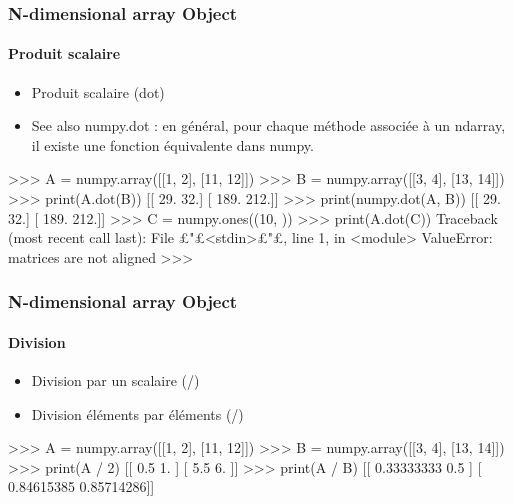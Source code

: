 \begin{frame}[fragile]
\frametitle{N-dimensional array Object}
\framesubtitle{Produit scalaire}
\begin{itemize}
 \item Produit scalaire (dot)
 \item See also numpy.dot : en général, pour chaque méthode associée à un ndarray, il existe une fonction équivalente dans numpy. 
\end{itemize}
\begin{pythonConsole}
>>> A = numpy.array([[1, 2], [11, 12]])
>>> B = numpy.array([[3, 4], [13, 14]])
>>> print(A.dot(B))
[[  29.   32.]
 [ 189.  212.]]
>>> print(numpy.dot(A, B))
[[  29.   32.]
 [ 189.  212.]]
>>> C = numpy.ones((10, ))
>>> print(A.dot(C))
Traceback (most recent call last):
  File £"£<stdin>£"£, line 1, in <module>
ValueError: matrices are not aligned
>>> 
\end{pythonConsole}
\end{frame}
\begin{frame}[fragile]
\frametitle{N-dimensional array Object}
\framesubtitle{Division}
\begin{itemize}
 \item Division par un scalaire (/)
 \item Division éléments par éléments (/) 
\end{itemize}
\begin{pythonConsole}
>>> A = numpy.array([[1, 2], [11, 12]])
>>> B = numpy.array([[3, 4], [13, 14]])
>>> print(A / 2)
[[ 0.5  1. ]				    
 [ 5.5  6. ]] 				    
>>> print(A / B)
[[ 0.33333333  0.5       ]      
 [ 0.84615385  0.85714286]]     
\end{pythonConsole}
\end{frame}
